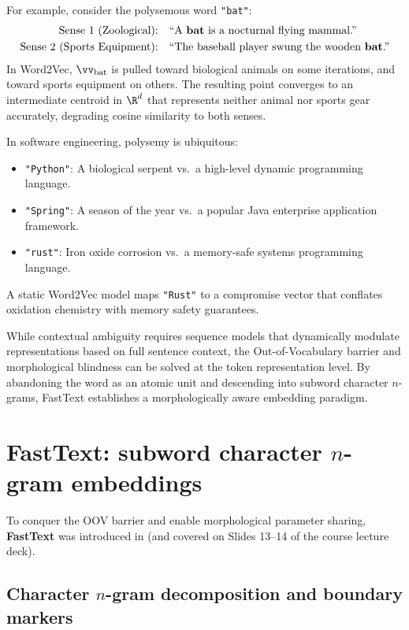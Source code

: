 \documentclass[../../main.tex]{subfiles}
\begin{document}
For example, consider the polysemous word \texttt{"bat"}:
\begin{align*}
\text{Sense 1 (Zoological):} \quad &\text{``A \textbf{bat} is a nocturnal flying mammal.''} \\
\text{Sense 2 (Sports Equipment):} \quad &\text{``The baseball player swung the wooden \textbf{bat}.''}
\end{align*}
In Word2Vec, $\vv_{\text{bat}}$ is pulled toward biological animals on some iterations, and toward sports equipment on others. The resulting point converges to an intermediate centroid in $\R^d$ that represents neither animal nor sports gear accurately, degrading cosine similarity to both senses.

In software engineering, polysemy is ubiquitous:
\begin{itemize}
    \item \texttt{"Python"}: A biological serpent vs.~a high-level dynamic programming language.
    \item \texttt{"Spring"}: A season of the year vs.~a popular Java enterprise application framework.
    \item \texttt{"rust"}: Iron oxide corrosion vs.~a memory-safe systems programming language.
\end{itemize}
A static Word2Vec model maps \texttt{"Rust"} to a compromise vector that conflates oxidation chemistry with memory safety guarantees.

While contextual ambiguity requires sequence models that dynamically modulate representations based on full sentence context, the Out-of-Vocabulary barrier and morphological blindness can be solved at the token representation level. By abandoning the word as an atomic unit and descending into subword character $n$-grams, FastText establishes a morphologically aware embedding paradigm.

\section{FastText: subword character \texorpdfstring{$n$}{n}-gram embeddings}
\label{sec:fasttext_subwords}

To conquer the OOV barrier and enable morphological parameter sharing, \textbf{FastText} was introduced in \cite{bojanowski2017} (and covered on Slides 13--14 of the course lecture deck).

\subsection{Character \texorpdfstring{$n$}{n}-gram decomposition and boundary markers}
\label{subsec:character_ngrams}
\end{document}

